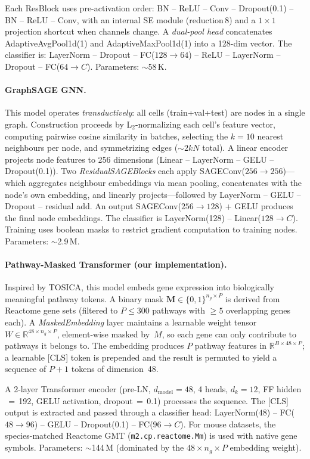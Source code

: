 \documentclass[11pt,letterpaper]{article}
\begin{document}
\noindent Each ResBlock uses pre-activation order: BN -- ReLU -- Conv --
Dropout(0.1) -- BN -- ReLU -- Conv, with an internal SE module (reduction\,8)
and a $1{\times}1$ projection shortcut when channels change. A \emph{dual-pool
head} concatenates AdaptiveAvgPool1d(1) and AdaptiveMaxPool1d(1) into a 128-dim
vector. The classifier is: LayerNorm -- Dropout -- FC($128{\to}64$) -- ReLU --
LayerNorm -- Dropout -- FC($64{\to}C$). Parameters: ${\sim}$58\,K.

\paragraph{GraphSAGE GNN.}
This model operates \emph{transductively}: all cells (train+val+test) are nodes
in a single graph. Construction proceeds by L$_2$-normalizing each cell's
feature vector, computing pairwise cosine similarity in batches, selecting the
$k{=}10$ nearest neighbours per node, and symmetrizing edges (${\sim}2kN$
total). A linear encoder projects node features to 256 dimensions (Linear --
LayerNorm -- GELU -- Dropout(0.1)). Two \emph{ResidualSAGEBlocks} each apply
SAGEConv($256{\to}256$)---which aggregates neighbour embeddings via mean
pooling, concatenates with the node's own embedding, and linearly
projects---followed by LayerNorm -- GELU -- Dropout -- residual add. An output
SAGEConv($256{\to}128$) + GELU produces the final node embeddings. The
classifier is LayerNorm(128) -- Linear($128{\to}C$). Training uses boolean
masks to restrict gradient computation to training nodes. Parameters:
${\sim}$2.9\,M.

\paragraph{Pathway-Masked Transformer (our implementation).}
Inspired by TOSICA, this model embeds gene expression into biologically
meaningful pathway tokens. A binary mask $\mathbf{M}\in\{0,1\}^{n_g \times P}$
is derived from Reactome gene sets (filtered to $P{\leq}300$ pathways with
${\geq}5$ overlapping genes each). A \emph{MaskedEmbedding} layer maintains a
learnable weight tensor $W\in\mathbb{R}^{48 \times n_g \times P}$, element-wise
masked by~$M$, so each gene can only contribute to pathways it belongs to. The
embedding produces $P$ pathway features in $\mathbb{R}^{B \times 48 \times P}$;
a learnable [CLS] token is prepended and the result is permuted to yield a
sequence of $P{+}1$ tokens of dimension~48.

A 2-layer Transformer encoder (pre-LN, $d_{\text{model}}{=}48$, 4 heads,
$d_k{=}12$, FF hidden$\,{=}\,$192, GELU activation, dropout$\,{=}\,$0.1)
processes the sequence. The [CLS] output is extracted and passed through a
classifier head: LayerNorm($48$) -- FC($48{\to}96$) -- GELU -- Dropout(0.1)
-- FC($96{\to}C$). For mouse datasets, the species-matched Reactome GMT
(\texttt{m2.cp.reactome.Mm}) is used with native gene symbols. Parameters:
${\sim}$144\,M (dominated by the $48 \times n_g \times P$ embedding weight).
\end{document}
